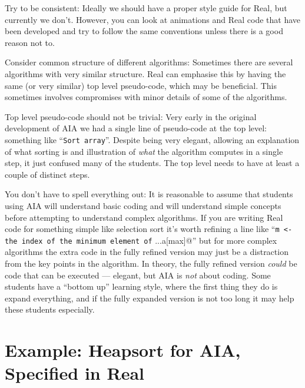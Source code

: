 \documentclass[11pt]{article}
\begin{document}
\begin{description}
\item{Try to be consistent:}
Ideally we should have a proper style guide for Real, but currently we
don't. However, you can look at animations and Real code that have been
developed and try to follow the same conventions unless there is a good
reason not to.

\item{Consider common structure of different algorithms:}
Sometimes there are several algorithms with very similar structure. Real
can emphasise this by having the same (or very similar) top level
pseudo-code, which may be beneficial. This sometimes involves compromises
with minor details of some of the algorithms.

\item{Top level pseudo-code should not be trivial:}
Very early in the original development of AIA we had a single
line of pseudo-code at the top level: something like ``\texttt{Sort
array}''. Despite being very elegant, allowing an explanation of what
sorting is and illustration of \emph{what} the algorithm computes in a
single step, it just confused many of the students. The top level needs
to have at least a couple of distinct steps.

\item{You don't have to spell everything out:}
It is reasonable to assume that students using AIA will understand basic
coding and will understand simple concepts before attempting to understand
complex algorithms. If you are writing Real code for something simple like
selection sort it's worth refining a line like ``\texttt{m <- the index
of the minimum element of} \verb@a[i]...a[max]@'' but for more complex
algorithms the extra code in the fully refined version may just be a
distraction from the key points in the algorithm. In theory, the fully
refined version \emph{could} be code that can be executed --- elegant,
but AIA is \emph{not} about coding.  Some students have a ``bottom up''
learning style, where the first thing they do is expand everything,
and if the fully expanded version is not too long it may help these
students especially.


\end{description}

\pagebreak
\section{Example: Heapsort for AIA, Specified in Real}
\end{document}
